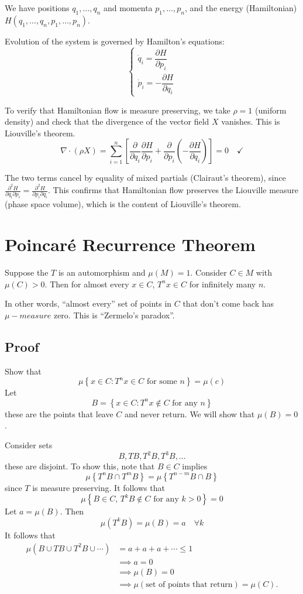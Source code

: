 \documentclass{article}
\begin{document}
We have positions $q_1, \ldots, q_n$ and momenta $p_1, \ldots, p_n$, 
and the energy (Hamiltonian) $H(q_1, \ldots, q_n, p_1, \ldots, p_n)$.

Evolution of the system is governed by Hamilton's equations:
\[
\begin{cases}
\dot{q}_i = \dfrac{\partial H}{\partial p_i} \\[6pt]
\dot{p}_i = -\dfrac{\partial H}{\partial q_i}
\end{cases}
\]

To verify that Hamiltonian flow is measure preserving, we take $\rho = 1$
(uniform density) and check that the divergence of the vector field $X$ vanishes. This is Liouville's theorem.
\[
\nabla \cdot (\rho X) = \sum_{i=1}^{n} \left[
\frac{\partial}{\partial q_i} \frac{\partial H}{\partial p_i}
+ \frac{\partial}{\partial p_i} \left( -\frac{\partial H}{\partial q_i} \right)
\right] = 0 \quad \checkmark
\]

The two terms cancel by equality of mixed partials (Clairaut's theorem), since $\frac{\partial^2 H}{\partial q_i \partial p_i} = \frac{\partial^2 H}{\partial p_i \partial q_i}$. This confirms that Hamiltonian flow preserves the Liouville measure (phase space volume), which is the content of Liouville's theorem.

\section{Poincaré Recurrence Theorem}

Suppose the $T$ is an automorphism and $\mu(M)=1$. Consider $C\in M$ with $\mu(C)>0$. Then for almost every $x\in C$, $T^n x\in C$ for infinitely many $n$.

In other words, ``almost every'' set of points in $C$ that don't come back has $\mu-measure$ zero. This is ``Zermelo's paradox''.

\subsection{Proof}

Show that 
\[
\mu\left\{x\in C : T^n x \in C \text{ for some }n\right\}=\mu(c)
\]
Let 
\[
B=\left\{x\in C : T^n x \notin C \text{ for any } n\right\}
\]
these are the points that leave $C$ and never return. We will show that $\mu(B)=0$.

Consider sets 
\[
B, TB, T^2 B, T^3B,\ldots 
\]
these are disjoint. To show this, note that $B\in C$ implies 
\[
\mu\left\{T^n B\cap T^m B\right\} = \mu \left\{ T^{n-m}B\cap B \right\}
\]
since $T$ is measure preserving. It follows that 
\[
\mu\left\{B\in C, \, T^k B \notin C \text{ for any } k>0\right\}=0
\]
Let $a=\mu(B)$. Then 
\[
\mu\left(T^k B\right)=\mu (B)=a\quad \forall k
\]
It follows that 
\begin{align*}
    \mu\left(B \cup TB \cup T^2 B \cup \cdots\right) &= a+ a + a +\cdots \leq 1\\
    &\implies a=0\\
    &\implies \mu(B) = 0\\
    &\implies \mu \left(\text{set of points that return}\right)=\mu(C).
\end{align*}
\end{document}
